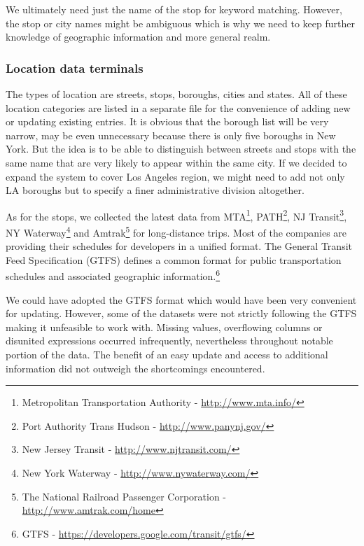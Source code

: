 We ultimately need just the name of the stop for keyword matching. 
However, the stop or city names might be ambiguous which is why we need to keep further knowledge of geographic information and more general realm. %

\subsubsection{Location data terminals} \label{sec:terminals}

The types of location are streets, stops, boroughs, cities and states.
All of these location categories are listed in a separate file for the convenience of adding new or updating existing entries.
It is obvious that the borough list will be very narrow, may be even unnecessary because there is only five boroughs in New York.
But the idea is to be able to distinguish between streets and stops with the same name that are very likely to appear within the same city.
If we decided to expand the system to cover Los Angeles region, we might need to add not only LA boroughs but to specify a finer administrative division altogether.

As for the stops, we collected the latest data from
MTA\footnote{Metropolitan Transportation Authority - \url{http://www.mta.info/}},
PATH\footnote{Port Authority Trans Hudson - \url{http://www.panynj.gov/}},
NJ Transit\footnote{New Jersey Transit - \url{http://www.njtransit.com/}},
NY Waterway\footnote{New York Waterway - \url{http://www.nywaterway.com/}} and
Amtrak\footnote{The National Railroad Passenger Corporation - \url{http://www.amtrak.com/home}} for long-distance trips.
Most of the companies are providing their schedules for developers in a unified format.
The General Transit Feed Specification (GTFS) defines a common format for public transportation schedules and associated geographic information.\footnote{GTFS - \url{https://developers.google.com/transit/gtfs/}}

We could have adopted the GTFS format which would have been very convenient for updating.
However, some of the datasets were not strictly following the GTFS making it unfeasible to work with.
Missing values, overflowing columns or disunited expressions occurred infrequently, nevertheless throughout notable portion of the data.
The benefit of an easy update and access to additional information did not outweigh the shortcomings encountered.

